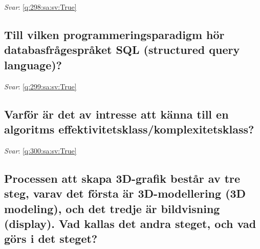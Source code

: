 \documentclass[a4paper,11pt,oneside]{article}
\begin{document}
\begin{sloppypar}
\vspace{2cm}

\noindent\makebox[\textwidth]{\hrulefill}

\vspace{1cm}

\textit{Svar}: \autoref{q:298:sa:sv:True}



\subsection{Till vilken programmeringsparadigm h\"or databasfr\r{a}gespr\r{a}ket SQL (structured query language)?}

\label{q:299:sa:sv:False}

\vspace{2cm}

\noindent\makebox[\textwidth]{\hrulefill}

\vspace{1cm}

\textit{Svar}: \autoref{q:299:sa:sv:True}



\subsection{Varf\"or \"ar det av intresse att k\"anna till en algoritms effektivitetsklass/komplexitetsklass?}

\label{q:300:sa:sv:False}

\vspace{2cm}

\noindent\makebox[\textwidth]{\hrulefill}

\vspace{1cm}

\textit{Svar}: \autoref{q:300:sa:sv:True}



\subsection{Processen att skapa 3D-grafik best\r{a}r av tre steg, varav det f\"orsta \"ar 3D-modellering (3D modeling), och det tredje \"ar bildvisning (display). Vad kallas det andra steget, och vad g\"ors i det steget?}

\label{q:301:sa:sv:False}

\vspace{2cm}

\noindent\makebox[\textwidth]{\hrulefill}


\end{sloppypar}
\end{document}

